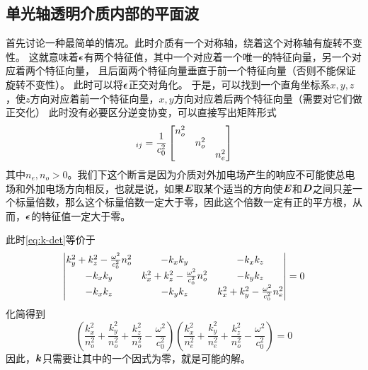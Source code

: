\documentclass[UTF8, a4paper]{ctexart}
\begin{document}
\subsection{单光轴透明介质内部的平面波}\label{sec:one-axis-transparent}

首先讨论一种最简单的情况。此时介质有一个对称轴，绕着这个对称轴有旋转不变性。
这就意味着$\vb*{\epsilon}$有两个特征值，其中一个对应着一个唯一的特征向量，另一个对应着两个特征向量，
且后面两个特征向量垂直于前一个特征向量（否则不能保证旋转不变性）。
此时可以将$\vb*{\epsilon}$正交对角化。
于是，可以找到一个直角坐标系$x,y,z$，使$z$方向对应着前一个特征向量，$x,y$方向对应着后两个特征向量（需要对它们做正交化）
此时没有必要区分逆变协变，可以直接写出矩阵形式
\begin{equation}
    [\mu \epsilon_{ij}]_{ij} = \frac{1}{c_0^2} \bmqty{\dmat{n_o^2,n_o^2,n_e^2}}
    \label{eq:one-axis-matrix}
\end{equation}
其中$n_e, n_o > 0$。我们下这个断言是因为介质对外加电场产生的响应不可能使总电场和外加电场方向相反，也就是说，如果$\vb*{E}$取某个适当的方向使$\vb*{E}$和$\vb*{D}$之间只差一个标量倍数，那么这个标量倍数一定大于零，因此这个倍数一定有正的平方根，从而，$\vb*{\epsilon}$的特征值一定大于零。

此时\eqref{eq:k-det}等价于
\[
    \mdet{
        k_y^2 + k_z^2 - \frac{\omega^2}{c_0^2} n_o^2 & -k_x k_y & - k_x k_z \\
        - k_x k_y & k_x^2 + k_z^2 - \frac{\omega^2}{c_0^2} n_o^2 & -k_y k_z \\
        -k_x k_z & -k_y k_z & k_x^2 + k_y^2 - \frac{\omega^2}{c_0^2} n_e^2
    } = 0
\]
化简得到
\begin{equation}
    \left( \frac{k_x^2}{n_o^2} + \frac{k_y^2}{n_o^2} + \frac{k_z^2}{n_o^2} - \frac{\omega^2}{c_0^2} \right) \left( \frac{k_x^2}{n_e^2} + \frac{k_y^2}{n_e^2} + \frac{k_z^2}{n_o^2} - \frac{\omega^2}{c_0^2} \right) = 0
    \label{eq:uniaxial-crystal}
\end{equation}
因此，$\vb*{k}$只需要让其中的一个因式为零，就是可能的解。
\end{document}

